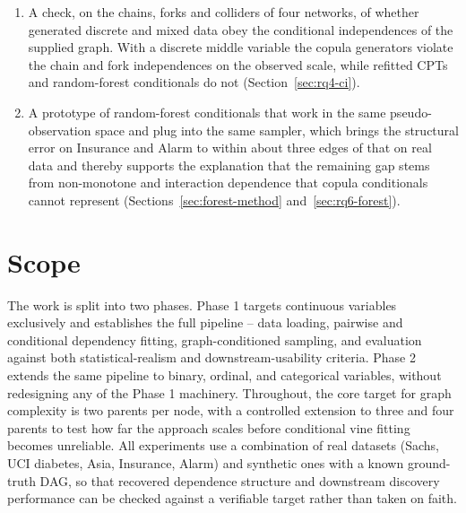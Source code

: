 \documentclass[
  english,
  class=report,
  accentcolor=2c,
  marginpar=false,
  parskip=half-,
  fontsize=11pt,
  ruledheaders=false,
  pdfa=false,
  IMRAD=false,
  thesis={type=master}
]{tudapub}
\begin{document}
\begin{enumerate}
    graphs, that learned dependencies transfer to graph structures that
    never existed in any source dataset, reproducing the transplanted
    copulas and yielding benchmarks that are not variance-sortable
    (Section~\ref{sec:composition}).
  \item A check, on the chains, forks and colliders of four networks, of
    whether generated discrete and mixed data obey the conditional
    independences of the supplied graph. With a discrete middle variable the
    copula generators violate the chain and fork independences on the
    observed scale, while refitted CPTs and random-forest conditionals do
    not (Section~\ref{sec:rq4-ci}).
  \item A prototype of random-forest conditionals that work in the same
    pseudo-observation space and plug into the same sampler, which brings
    the structural error on Insurance and Alarm to within about three
    edges of that on real data and thereby supports the explanation that the remaining gap stems
    from non-monotone and interaction dependence that copula conditionals
    cannot represent (Sections~\ref{sec:forest-method}
    and~\ref{sec:rq6-forest}).
\end{enumerate}

\section{Scope}
The work is split into two phases. Phase 1 targets continuous variables
exclusively and establishes the full pipeline -- data loading, pairwise and
conditional dependency fitting, graph-conditioned sampling, and evaluation
against both statistical-realism and downstream-usability criteria. Phase 2
extends the same pipeline to binary, ordinal, and categorical variables,
without redesigning any of the Phase 1 machinery. Throughout, the core
target for graph complexity is two parents per node, with a controlled
extension to three and four parents to test how far the approach scales
before conditional vine fitting becomes unreliable. All experiments use a
combination of real datasets (Sachs, UCI diabetes, Asia, Insurance,
Alarm) and
synthetic ones with a known ground-truth DAG, so that recovered dependence
structure and downstream discovery performance can be checked against a
verifiable target rather than taken on faith.
\end{document}
